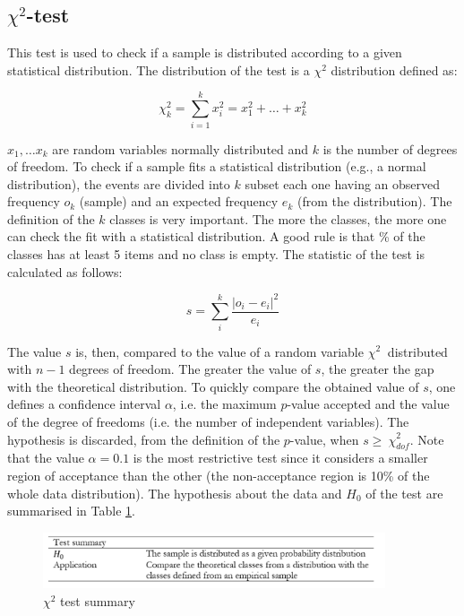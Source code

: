 \subsection{$\chi^{2}$-test}
This test is used to check if a sample is distributed according to a given statistical distribution. The distribution of the test is a $\chi^2$ distribution defined as:

\begin{equation}
\chi_k^2=\sum_{i=1}^{k}{x_i^2=x_1^2+\ldots+x_k^2}
\label{eq_chi2Distribution}
\end{equation}

$x_1,\ldots x_k$ are random variables normally distributed and $k$ is the number of degrees of freedom. To check if a sample fits a statistical distribution (e.g., a normal distribution), the events are divided into $k$ subset each one having an observed frequency $o_k$ (sample) and an expected frequency $e_k$ (from the distribution). The definition of the $k$ classes is very important. The more the classes, the more one can check the fit with a statistical distribution. A good rule is that \% of the classes has at least 5 items and no class is empty. The statistic of the test is calculated as follows:

\begin{equation}
s=\sum_{i}^{k}\frac{\left|o_i-e_i\right|^2}{e_i}
\label{eq_chi2test}
\end{equation}

The value $s$ is, then, compared to the value of a random variable $\chi^2\ $ distributed with $n-1$ degrees of freedom. The greater the value of $s$, the greater the gap with the theoretical distribution. To quickly compare the obtained value of $s$, one defines a confidence interval $\alpha$, i.e. the maximum $p$-value accepted and the value of the degree of freedoms (i.e. the number of independent variables). The hypothesis is discarded, from the definition of the $p$-value, when ${s\geq\ \chi}_{dof}^2$. Note that the value $\alpha=0.1$ is the most restrictive test since it considers a smaller region of acceptance than the other (the non-acceptance region is 10\% of the whole data distribution). The hypothesis about the data and $H_0$ of the test are summarised in Table \ref{tab_Chi2}.


\begin{figure}[hbt!]
\centering
\includegraphics[width=0.9\textwidth]{SectionLetsMath/elemStat_figures/tab_Chi2.png}
\captionsetup{type=table}
\caption{$\chi^2$ test summary}
\label{tab_Chi2}
\end{figure}

